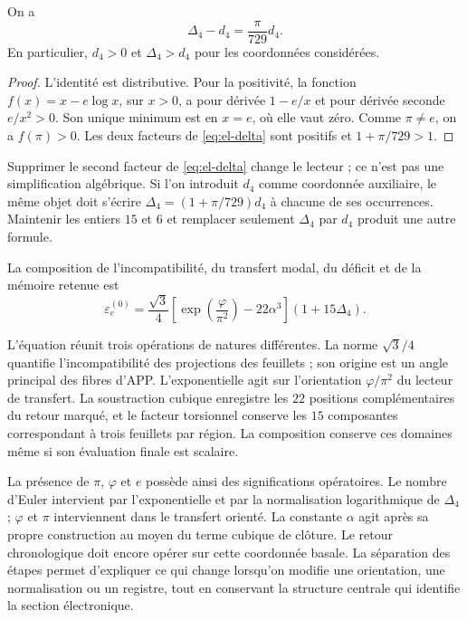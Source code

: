 \begin{lemma}
On a
\begin{equation}
 \Delta_4-d_4=\frac{\pi}{729}d_4.
 \label{eq:el-delta-diferencia}
\end{equation}
En particulier, \(d_4>0\) et \(\Delta_4>d_4\) pour les coordonnées
considérées.
\end{lemma}
\begin{proof}
L'identité est distributive. Pour la positivité, la fonction
\(f(x)=x-e\log x\), sur \(x>0\), a pour dérivée \(1-e/x\) et
pour dérivée seconde \(e/x^2>0\). Son unique minimum est en \(x=e\), où
elle vaut zéro. Comme \(\pi\ne e\), on a \(f(\pi)>0\). Les deux facteurs
de \eqref{eq:el-delta} sont positifs et \(1+\pi/729>1\).
\end{proof}

\begin{remark}
Supprimer le second facteur de \eqref{eq:el-delta} change le lecteur ; ce n'est pas une simplification algébrique. Si l'on introduit \(d_4\) comme coordonnée auxiliaire, le même objet doit s'écrire \(\Delta_4=(1+\pi/729)d_4\) à chacune de ses occurrences. Maintenir les entiers \(15\) et \(6\) et remplacer seulement \(\Delta_4\) par \(d_4\) produit une autre formule.
\end{remark}

\begin{definition}
La composition de l'incompatibilité, du transfert modal, du déficit et de la mémoire retenue
est
\begin{equation}
 \varepsilon_e^{(0)}
 =\frac{\sqrt3}{4}
  \left[\exp\!\left(\frac{\varphi}{\pi^2}\right)-22\alpha^3\right]
  (1+15\Delta_4).
 \label{eq:el-basal}
\end{equation}
\end{definition}

L'équation réunit trois opérations de natures différentes. La norme
\(\sqrt3/4\) quantifie l'incompatibilité des projections des
feuillets ; son origine est un angle principal des fibres d'APP.
L'exponentielle agit sur l'orientation \(\varphi/\pi^2\) du
lecteur de transfert. La soustraction cubique enregistre les \(22\) positions
complémentaires du retour marqué, et le facteur torsionnel conserve les
\(15\) composantes correspondant à trois feuillets par région. La
composition conserve ces domaines même si son évaluation finale est scalaire.

La présence de \(\pi\), \(\varphi\) et \(e\) possède ainsi des significations
opératoires. Le nombre d'Euler intervient par l'exponentielle et par
la normalisation logarithmique de \(\Delta_4\) ; \(\varphi\) et \(\pi\)
interviennent dans le transfert orienté. La constante \(\alpha\)
agit après sa propre construction au moyen du terme cubique
de clôture. Le retour chronologique doit encore opérer sur cette coordonnée
basale. La séparation des étapes permet d'expliquer ce qui change lorsqu'on modifie
une orientation, une normalisation ou un registre, tout en conservant la structure
centrale qui identifie la section électronique.

